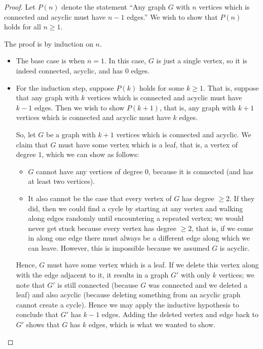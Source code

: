 \documentclass{tufte-handout}
\begin{document}
\begin{proof}
  Let $P(n)$ denote the statement ``Any graph $G$ with $n$ vertices
  which is connected and acyclic must have $n-1$ edges.''  We wish to
  show that $P(n)$ holds for all $n \geq 1$.

  The proof is by induction on $n$.
  \begin{itemize}
  \item The base case is when $n = 1$. In this case, $G$ is just
    a single vertex, so it is indeed connected, acyclic, and has $0$
    edges.
  \item For the induction step, suppose $P(k)$ holds for some $k \geq
    1$.  That is, suppose that any graph with $k$ vertices which is
    connected and acyclic must have $k-1$ edges.  Then we wish to show
    $P(k+1)$, that is, any graph with $k+1$ vertices which is
    connected and acyclic must have $k$ edges.

    So, let $G$ be a graph with $k+1$ vertices which is connected and
    acyclic.  We claim that $G$ must have some vertex which is a leaf,
    that is, a vertex of degree $1$, which we can show as
    follows:
    \begin{itemize}
    \item $G$ cannot have any vertices of degree $0$, because
      it is connected (and has at least two vertices).
    \item It also cannot be the case that every vertex of $G$ has
      degree $\geq 2$.  If they did, then we could find a cycle by
      starting at any vertex and walking along edges randomly until
      encountering a repeated vertex; we would never get stuck because
      every vertex has degree $\geq 2$, that is, if we come in along
      one edge there must always be a different edge along which we
      can leave. However, this is impossible because we assumed
      $G$ is acyclic.
    \end{itemize}
    Hence, $G$ must have some vertex which is a leaf. If we delete
    this vertex along with the edge adjacent to it, it results in a
    graph $G'$ with only $k$ vertices; we note that $G'$ is still
    connected (because $G$ was connected and we deleted a leaf) and
    also acyclic (because deleting something from an acyclic graph
    cannot create a cycle).  Hence we may apply the inductive
    hypothesis to conclude that $G'$ has $k-1$ edges.  Adding the
    deleted vertex and edge back to $G'$ shows that $G$ has $k$ edges,
    which is what we wanted to show.
  \end{itemize}
\end{proof}
\end{document}

